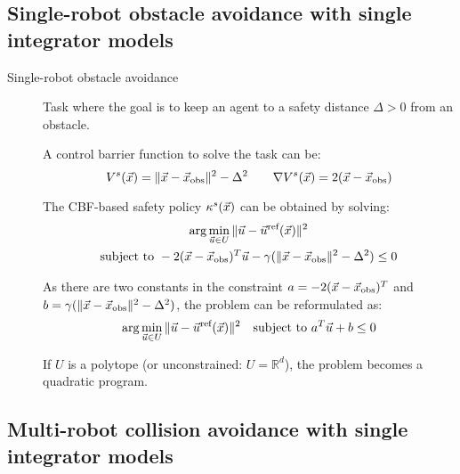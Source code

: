 \subsection{Single-robot obstacle avoidance with single integrator models}

\begin{description}
    \item[Single-robot obstacle avoidance]  
        Task where the goal is to keep an agent to a safety distance $\Delta > 0$ from an obstacle.

        A control barrier function to solve the task can be:
        \[
            V^s({\vec{x}}) = \Vert {\vec{x}} - {\vec{x}}_\text{obs} \Vert^2 - \Delta^2
            \qquad
            \nabla V^s({\vec{x}}) = 2({\vec{x}} - {\vec{x}}_\text{obs})
        \]

        The CBF-based safety policy $\kappa^s({\vec{x}})$ can be obtained by solving:
        \[
            \begin{gathered}
                \arg\min_{{\vec{u}} \in U} \Vert {\vec{u}} - {\vec{u}}^\text{ref}({\vec{x}}) \Vert^2 \\
                \text{subject to } -2({\vec{x}}-{\vec{x}}_\text{obs})^T {\vec{u}} - \gamma(\Vert {\vec{x}}-{\vec{x}}_\text{obs} \Vert^2 - \Delta^2) \leq 0
            \end{gathered}
        \]

        As there are two constants in the constraint $a = -2({\vec{x}}-{\vec{x}}_\text{obs})^T$ and $b = \gamma(\Vert {\vec{x}}-{\vec{x}}_\text{obs} \Vert^2 - \Delta^2)$, the problem can be reformulated as:
        \[
            \arg\min_{{\vec{u}} \in U} \Vert {\vec{u}} - {\vec{u}}^\text{ref}({\vec{x}}) \Vert^2 \quad \text{subject to } a^T {\vec{u}} + b \leq 0
        \]
        
        \begin{remark}
            If $U$ is a polytope (or unconstrained: $U = \mathbb{R}^d$), the problem becomes a quadratic program.
        \end{remark}
\end{description}


\subsection{Multi-robot collision avoidance with single integrator models}


